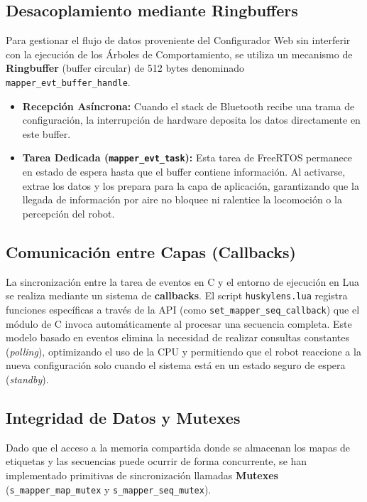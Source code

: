 \documentclass{prgrado}
\begin{document}
\subsection{Desacoplamiento mediante Ringbuffers}
Para gestionar el flujo de datos proveniente del Configurador Web sin interferir con la ejecución de los Árboles de Comportamiento, se utiliza un mecanismo de \textbf{Ringbuffer} (buffer circular) de 512 bytes denominado \texttt{mapper\_evt\_buffer\_handle}.

\begin{itemize}
    \item \textbf{Recepción Asíncrona:} Cuando el stack de Bluetooth recibe una trama de configuración, la interrupción de hardware deposita los datos directamente en este buffer.
    \item \textbf{Tarea Dedicada (\texttt{mapper\_evt\_task}):} Esta tarea de FreeRTOS permanece en estado de espera hasta que el buffer contiene información. Al activarse, extrae los datos y los prepara para la capa de aplicación, garantizando que la llegada de información por aire no bloquee ni ralentice la locomoción o la percepción del robot.
\end{itemize}

\subsection{Comunicación entre Capas (Callbacks)}
La sincronización entre la tarea de eventos en C y el entorno de ejecución en Lua se realiza mediante un sistema de \textbf{callbacks}. El script \texttt{huskylens.lua} registra funciones específicas a través de la API (como \texttt{set\_mapper\_seq\_callback}) que el módulo de C invoca automáticamente al procesar una secuencia completa. Este modelo basado en eventos elimina la necesidad de realizar consultas constantes (\textit{polling}), optimizando el uso de la CPU y permitiendo que el robot reaccione a la nueva configuración solo cuando el sistema está en un estado seguro de espera (\textit{standby}).

\subsection{Integridad de Datos y Mutexes}
Dado que el acceso a la memoria compartida donde se almacenan los mapas de etiquetas y las secuencias puede ocurrir de forma concurrente, se han implementado primitivas de sincronización llamadas \textbf{Mutexes} (\texttt{s\_mapper\_map\_mutex} y \texttt{s\_mapper\_seq\_mutex}). 
\end{document}
